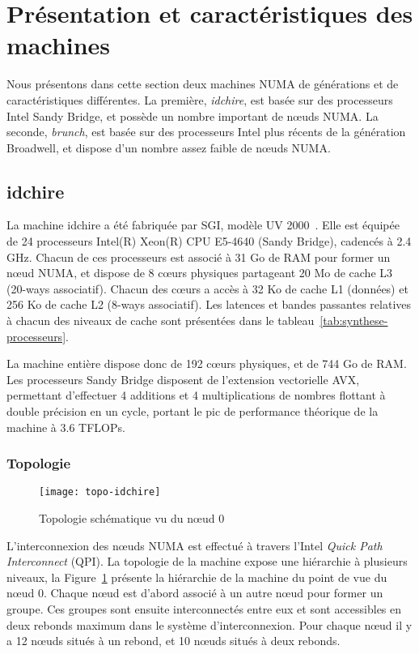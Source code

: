 \section{Présentation et caractéristiques des machines}\label{sec:contribs:machines}

Nous présentons dans cette section deux machines NUMA de générations et de caractéristiques différentes.
La première, \emph{idchire}, est basée sur des processeurs Intel Sandy Bridge, et possède un nombre important de nœuds NUMA.
La seconde, \emph{brunch}, est basée sur des processeurs Intel plus récents de la génération Broadwell, et dispose d'un nombre assez faible de nœuds NUMA.

\subsection{idchire}\label{sec:contribs:machines:idchire}

La machine idchire a été fabriquée par SGI, modèle UV 2000~\cite{uv2000}.
Elle est équipée de 24 processeurs Intel(R) Xeon(R) CPU E5-4640 (Sandy Bridge), cadencés à 2.4 GHz.
Chacun de ces processeurs est associé à 31 Go de RAM pour former un nœud NUMA, et dispose de 8 cœurs physiques partageant 20 Mo de cache L3 (20-ways associatif).
Chacun des cœurs a accès à 32 Ko de cache L1 (données) et 256 Ko de cache L2 (8-ways associatif).
Les latences et bandes passantes relatives à chacun des niveaux de cache sont présentées dans le tableau~\ref{tab:synthese-processeurs}.

La machine entière dispose donc de 192 cœurs physiques, et de 744 Go de RAM.
Les processeurs Sandy Bridge disposent de l'extension vectorielle AVX, permettant d'effectuer 4 additions et 4 multiplications de nombres flottant à double précision en un cycle, portant le pic de performance théorique de la machine à 3.6 TFLOPs.

\subsubsection{Topologie}

\begin{figure}[ht]
  \centering
  \texttt{[image: topo-idchire]}
  \caption{Topologie schématique vu du nœud 0}\label{fig:contribs:machines:idchire:topo-liens}
\end{figure}

L'interconnexion des nœuds NUMA est effectué à travers l'Intel \emph{Quick Path Interconnect} (QPI).
La topologie de la machine expose une hiérarchie à plusieurs niveaux, la Figure~\ref{fig:contribs:machines:idchire:topo-liens} présente la hiérarchie de la machine du point de vue du nœud 0.
Chaque nœud est d'abord associé à un autre nœud pour former un groupe. Ces groupes sont ensuite interconnectés entre eux et sont accessibles en deux rebonds maximum dans le système d'interconnexion.
Pour chaque nœud il y a 12 nœuds situés à un rebond, et 10 nœuds situés à deux rebonds.

